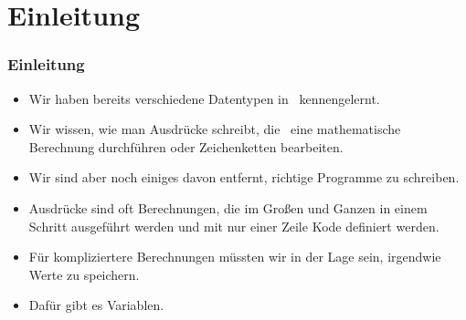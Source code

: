 \documentclass[aspectratio=169,mathserif,notheorems]{beamer}%
\subtitle{13.~Variablen:~Wertzuweisung}%
\begin{document}
%
%
\startPresentation%
%
\section{Einleitung}%
\begin{frame}%
\frametitle{Einleitung}%
\begin{itemize}%
\item Wir haben bereits verschiedene Datentypen in \python\ kennengelernt.%
\item<2-> Wir wissen, wie man Ausdrücke schreibt, die \DEzB~eine mathematische Berechnung durchführen oder Zeichenketten bearbeiten.%
\item<3-> Wir sind aber noch einiges davon entfernt, richtige Programme zu schreiben.%
\item<4-> Ausdrücke sind oft Berechnungen, die im Großen und Ganzen in einem Schritt ausgeführt werden und mit nur einer Zeile Kode definiert werden.%
\item<5-> Für kompliziertere Berechnungen müssten wir in der Lage sein, irgendwie Werte zu speichern.%
\item<6-> Dafür gibt es \alert{Variablen}.
\end{itemize}%
\end{frame}%
%
\end{document}
